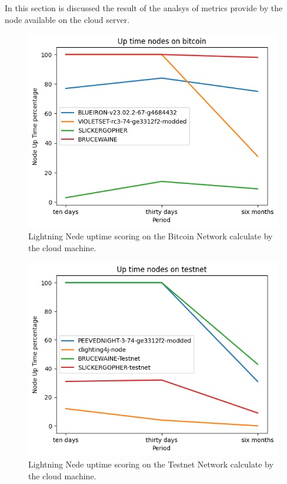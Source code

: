 In this section is discussed the result of the analsys of metrics provide by 
the node available on the cloud server.

\begin{figure}
    \begin{center}
      \includegraphics[scale=0.7]{imgs/bitcoin_uptime.png}
    \end{center}
    \caption{Lightning Nede uptime scoring on the Bitcoin Network calculate by the cloud machine.}
    \label{fig:lnmetrics_uptime_bitcoin}
\end{figure}

\begin{figure}
    \begin{center}
      \includegraphics[scale=0.7]{imgs/testnet_uptime.png}
    \end{center}
    \caption{Lightning Nede uptime scoring on the Testnet Network calculate by the cloud machine.}
    \label{fig:lnmetrics_uptime_testnet}
\end{figure}

